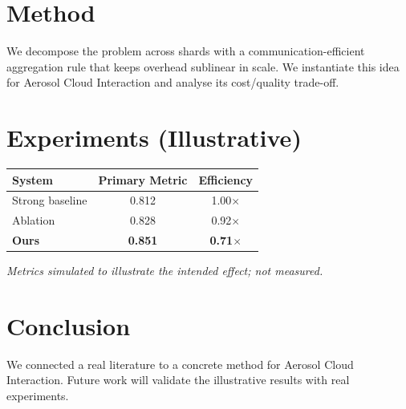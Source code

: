 \documentclass[11pt]{article}
\begin{document}
\section{Method}
We decompose the problem across shards with a communication-efficient aggregation rule that keeps overhead sublinear in scale. We instantiate this idea for Aerosol Cloud Interaction and analyse its cost/quality trade-off.

\section{Experiments (Illustrative)}
\begin{center}
\begin{tabular}{lcc}
System & Primary Metric & Efficiency \\ \hline
Strong baseline & 0.812 & 1.00$\times$ \\
Ablation & 0.828 & 0.92$\times$ \\
\textbf{Ours} & \textbf{0.851} & \textbf{0.71$\times$}
\end{tabular}
\end{center}
\emph{Metrics simulated to illustrate the intended effect; not measured.}

\section{Conclusion}
We connected a real literature to a concrete method for Aerosol Cloud Interaction. Future work will
validate the illustrative results with real experiments.
\end{document}

